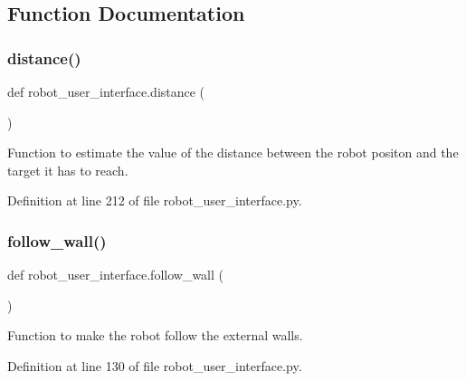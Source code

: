 \subsection{Function Documentation}
\mbox{\label{namespacerobot__user__interface_a20558ce4717c6399da8e04e96858203f}} 
\subsubsection{\texorpdfstring{distance()}{distance()}}
{\footnotesize\ttfamily def robot\+\_\+user\+\_\+interface.\+distance (\begin{DoxyParamCaption}{ }\end{DoxyParamCaption})}



Function to estimate the value of the distance between the robot positon and the target it has to reach. 



Definition at line 212 of file robot\+\_\+user\+\_\+interface.\+py.

\mbox{\label{namespacerobot__user__interface_a74312af906c16599bef2c4ade3ef87a4}} 
\subsubsection{\texorpdfstring{follow\+\_\+wall()}{follow\_wall()}}
{\footnotesize\ttfamily def robot\+\_\+user\+\_\+interface.\+follow\+\_\+wall (\begin{DoxyParamCaption}{ }\end{DoxyParamCaption})}



Function to make the robot follow the external walls. 



Definition at line 130 of file robot\+\_\+user\+\_\+interface.\+py.

\mbox{\label{namespacerobot__user__interface_a6c919b4750dd38ddd929c5e456053de0}} 
